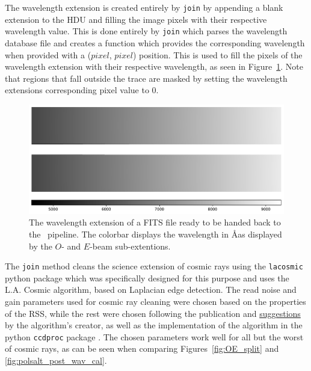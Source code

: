 The wavelength extension is created entirely by \texttt{join} by appending a blank extension to the \gls{HDU} and filling the image pixels with their respective wavelength value. This is done entirely by \texttt{join} which parses the wavelength database file and creates a function which provides the corresponding wavelength when provided with a ($pixel$, $pixel$) position. This is used to fill the pixels of the wavelength extension with their respective wavelength, as seen in Figure~\ref{fig:pol_wav_ext}. Note that regions that fall outside the trace are masked by setting the wavelength extensions corresponding pixel value to $0$.

\begin{figure}[t]
    \centering
    \includegraphics[width = 1.0\textwidth]{figures/3_pol_wav_ext.pdf}
    \caption{The wavelength extension of a \gls{FITS} file ready to be handed back to the \polsalt\ pipeline. The colorbar displays the wavelength in \AA as displayed by the $O$- and $E$-beam sub-extentions.}
    \label{fig:pol_wav_ext}
\end{figure}

The \texttt{join} method cleans the science extension of cosmic rays using the \texttt{lacosmic} python package which was specifically designed for this purpose and uses the L.A. Cosmic algorithm, based on Laplacian edge detection. The read noise and gain parameters used for cosmic ray cleaning were chosen based on the properties of the \gls{RSS}, while the rest were chosen following the publication and \hyperlink{http://www.astro.yale.edu/dokkum/lacosmic/pars.html}{suggestions} by the algorithm's creator, as well as the implementation of the algorithm in the python \texttt{ccdproc} package \citep{lacosmic,astroscrappy}. The chosen parameters work well for all but the worst of cosmic rays, as can be seen when comparing Figures~\ref{fig:OE_split} and \ref{fig:polsalt_post_wav_cal}.

